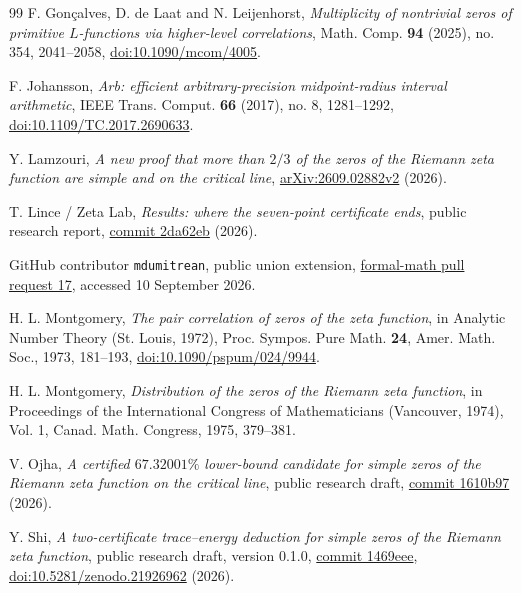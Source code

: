 \begin{thebibliography}{99}
 F. Gon\c{c}alves, D. de Laat and N. Leijenhorst,
\emph{Multiplicity of nontrivial zeros of primitive $L$-functions
via higher-level correlations}, Math. Comp. \textbf{94} (2025),
no. 354, 2041--2058,
\href{https://doi.org/10.1090/mcom/4005}{doi:10.1090/mcom/4005}.

 F. Johansson,
\emph{Arb: efficient arbitrary-precision midpoint-radius interval arithmetic},
IEEE Trans. Comput. \textbf{66} (2017), no. 8, 1281--1292,
\href{https://doi.org/10.1109/TC.2017.2690633}{doi:10.1109/TC.2017.2690633}.

 Y. Lamzouri,
\emph{A new proof that more than $2/3$ of the zeros of the Riemann
zeta function are simple and on the critical line},
\href{https://arxiv.org/abs/2609.02882v2}{arXiv:2609.02882v2} (2026).

 T. Lince / Zeta Lab,
\emph{Results: where the seven-point certificate ends}, public research
report, \href{https://github.com/teal-sea/zeta-lab/blob/2da62eb9842db72d4f6bad09c6f13efe384d6ab7/hunts/ainta_seven_point/RESULTS.md}{commit 2da62eb} (2026).

 GitHub contributor \texttt{mdumitrean},
public union extension,
\href{https://github.com/anthropics/formal-math/pull/17}{formal-math pull request 17},
accessed 10 September 2026.

 H. L. Montgomery,
\emph{The pair correlation of zeros of the zeta function},
in Analytic Number Theory (St. Louis, 1972),
Proc. Sympos. Pure Math. \textbf{24}, Amer. Math. Soc., 1973, 181--193,
\href{https://doi.org/10.1090/pspum/024/9944}{doi:10.1090/pspum/024/9944}.

 H. L. Montgomery,
\emph{Distribution of the zeros of the Riemann zeta function},
in Proceedings of the International Congress of Mathematicians
(Vancouver, 1974), Vol. 1, Canad. Math. Congress, 1975, 379--381.

 V. Ojha,
\emph{A certified $67.32001\%$ lower-bound candidate for simple zeros
of the Riemann zeta function on the critical line}, public research draft,
\href{https://github.com/trmdy/zeta-simple-zeros-673137/tree/1610b97b7895ff34982260f8dcaf04a0f7b82cf7}{commit 1610b97} (2026).

 Y. Shi,
\emph{A two-certificate trace--energy deduction for simple zeros
of the Riemann zeta function}, public research draft, version 0.1.0,
\href{https://github.com/yuhangshi888/zeta-simple-zeros-673316977/tree/1469eeefe29c48c971ecf98092bc82751dea8bca}{commit 1469eee},
\href{https://doi.org/10.5281/zenodo.21926962}{doi:10.5281/zenodo.21926962} (2026).


\end{thebibliography}
